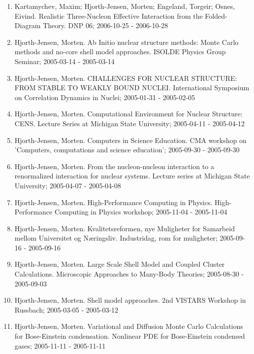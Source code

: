 \documentclass[%
oneside,                 %
final,                   %
10pt]{article}
\begin{document}
\begin{enumerate}
\item Kartamychev, Maxim; Hjorth-Jensen, Morten; Engeland, Torgeir; Osnes, Eivind. Realistic Three-Nucleon Effective Interaction from the Folded-Diagram Theory. DNP 06; 2006-10-25 - 2006-10-28

\item Hjorth-Jensen, Morten.  Ab Initio nuclear structure methods: Monte Carlo methods and no-core shell model approaches. ISOLDE Physics Group Seminar; 2005-03-14 - 2005-03-14

\item Hjorth-Jensen, Morten. CHALLENGES FOR NUCLEAR STRUCTURE: FROM STABLE TO WEAKLY BOUND NUCLEI. International Symposium on Correlation Dynamics in Nuclei; 2005-01-31 - 2005-02-05

\item Hjorth-Jensen, Morten.  Computational Environment for Nuclear Structure: CENS. Lecture Series at Michigan State University; 2005-04-11 - 2005-04-12

\item Hjorth-Jensen, Morten.  Computers in Science Education. CMA workshop on 'Computers, computations and science education'; 2005-09-30 - 2005-09-30

\item Hjorth-Jensen, Morten.  From the nucleon-nucleon interaction to a renormalized interaction for nuclear systems. Lecture series at Michigan State University; 2005-04-07 - 2005-04-08

\item Hjorth-Jensen, Morten.  High-Performance Computing in Physics. High-Performance Computing in Physics workshop; 2005-11-04 - 2005-11-04

\item Hjorth-Jensen, Morten.  Kvalitetsreformen, nye Muligheter for Samarbeid mellom Universitet og Næringsliv. Industridag, rom for muligheter; 2005-09-16 - 2005-09-16

\item Hjorth-Jensen, Morten.  Large Scale Shell Model and Coupled Cluster Calculations. Microscopic Approaches to Many-Body Theories; 2005-08-30 - 2005-09-03

\item Hjorth-Jensen, Morten.  Shell model approaches. 2nd VISTARS Workshop in Russbach; 2005-03-05 - 2005-03-12

\item Hjorth-Jensen, Morten.  Variational and Diffusion Monte Carlo Calculations for Bose-Einstein condensation. Nonlinear PDE for Bose-Einstein condensed gases; 2005-11-11 - 2005-11-11


\end{enumerate}
\end{document}
